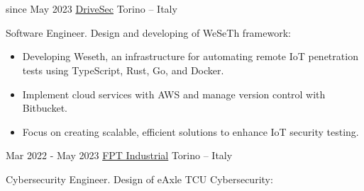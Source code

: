 \documentclass[]{twentysecondcv}
\begin{document}
\section{\raisedrule[0\baselineskip]{1pt}\circled{}} 
\vspace{-10pt}
\begin{twenty}
	\twentyitem
	{since May 2023}
	{\href{https://www.drivesec.com/}{DriveSec}}
	{Torino – Italy}
	{Software Engineer. Design and developing of WeSeTh framework:
		\begin{itemize}		
			\item Developing Weseth, an infrastructure for automating remote IoT penetration tests using TypeScript, Rust, Go, and Docker. \item Implement cloud services with AWS and manage version control with Bitbucket. 
			\item Focus on creating scalable, efficient solutions to enhance IoT security testing.
		\end{itemize}
	}
	\twentyitem
	{Mar 2022 - May 2023}
	{\href{https://www.fptindustrial.com/}{FPT Industrial}}
	{Torino – Italy}
	{Cybersecurity Engineer. Design of eAxle TCU Cybersecurity:
		\begin{itemize}		

\end{itemize}}
\end{twenty}
\end{document}
